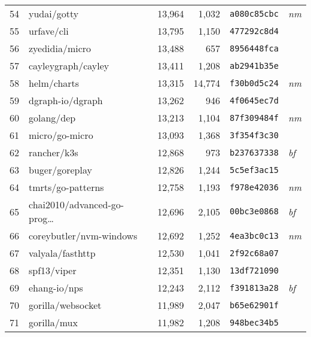 {\begin{supertabular}{llrrll}
        54  &                        yudai/gotty & 13,964 &  1,032 &  \texttt{a080c85cbc} &  \textit{nm} \\
        55  &                         urfave/cli & 13,795 &  1,150 &  \texttt{477292c8d4} &              \\
        56  &                     zyedidia/micro & 13,488 &    657 &  \texttt{8956448fca} &              \\
        57  &                 cayleygraph/cayley & 13,411 &  1,208 &  \texttt{ab2941b35e} &              \\
        58  &                        helm/charts & 13,315 & 14,774 &  \texttt{f30b0d5c24} &  \textit{nm} \\
        59  &                   dgraph-io/dgraph & 13,262 &    946 &  \texttt{4f0645ec7d} &              \\
        60  &                         golang/dep & 13,213 &  1,104 &  \texttt{87f309484f} &  \textit{nm} \\
        61  &                     micro/go-micro & 13,093 &  1,368 &  \texttt{3f354f3c30} &              \\
        62  &                        rancher/k3s & 12,868 &    973 &  \texttt{b237637338} &  \textit{bf} \\
        63  &                     buger/goreplay & 12,826 &  1,244 &  \texttt{5c5ef3ac15} &              \\
        64  &                  tmrts/go-patterns & 12,758 &  1,193 &  \texttt{f978e42036} &  \textit{nm} \\
        65  &    chai2010/advanced-go-prog\ldots & 12,696 &  2,105 &  \texttt{00bc3e0868} &  \textit{bf} \\
        66  &            coreybutler/nvm-windows & 12,692 &  1,252 &  \texttt{4ea3bc0c13} &  \textit{nm} \\
        67  &                   valyala/fasthttp & 12,530 &  1,041 &  \texttt{2f92c68a07} &              \\
        68  &                        spf13/viper & 12,351 &  1,130 &  \texttt{13df721090} &              \\
        69  &                       ehang-io/nps & 12,243 &  2,112 &  \texttt{f391813a28} &  \textit{bf} \\
        70  &                  gorilla/websocket & 11,989 &  2,047 &  \texttt{b65e62901f} &              \\
        71  &                        gorilla/mux & 11,982 &  1,208 &  \texttt{948bec34b5} &              \\

\end{supertabular}}
